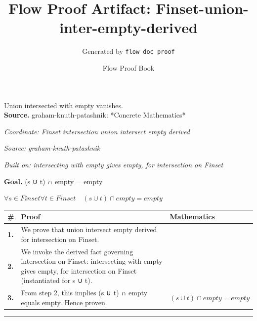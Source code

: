 \documentclass[11pt]{article}
\title{Flow Proof Artifact: Finset-union-inter-empty-derived}
\author{Generated by \texttt{flow doc proof}}
\date{Flow Proof Book}
\theoremstyle{definition}
\begin{document}
\maketitle
Union intersected with empty vanishes.\\[0.5em]
\textbf{Source.} graham-knuth-patashnik: *Concrete Mathematics*\\[0.5em]
\bigskip
{}\par
\smallskip\noindent\textit{Coordinate: Finset \cdot intersection \cdot union intersect empty derived}\par
\smallskip\noindent\textit{Source: graham-knuth-patashnik}\par
\smallskip\noindent\textit{Built on: intersecting with empty gives empty, for intersection on Finset}\par
\medskip
\noindent\textbf{Goal.} (s ∪ t) ∩ empty = empty\par
\noindent$\displaystyle \forall s \in Finset \forall t \in Finset\quad (s ∪ t) ∩ empty = empty$\par
\medskip
\noindent
\begin{tabular}{@{} >{\raggedright\arraybackslash}p{} >{\raggedright\arraybackslash}p{} >{\raggedleft\arraybackslash}p{} @{}}
\textbf{\#} & \textbf{Proof} & \textbf{Mathematics} \\
\midrule
\textbf{1.} & We prove that union intersect empty derived for intersection on Finset. & \\[0.45em]
\textbf{2.} & We invoke the derived fact governing intersection on Finset: intersecting with empty gives empty, for intersection on Finset (instantiated for s ∪ t). & \\[0.45em]
\textbf{3.} & From step 2, this implies (s ∪ t) ∩ empty equals empty. Hence proven. & $\displaystyle (s ∪ t) ∩ empty = empty$ \\[0.45em]
\bottomrule
\end{tabular}
\label{thm:Finset-intersection-union_intersect_empty_derived}
\par\medskip\hrule
\end{document}
